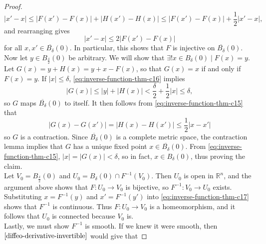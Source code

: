 \documentclass[reqno]{amsart}
\theoremstyle{plain}%
\theoremstyle{definition}
\theoremstyle{remark}
\begin{document}
\begin{proof}
        \[
        \left| x' - x \right| \le \left| F(x')- F(x) \right| +
        \left| H(x') - H(x) \right| \le 
        \left| F(x') - F(x) \right| +\frac{1}{2} \left| x' -x \right| ,
        \] 
        and rearranging gives
        \[
            \left| x' -x \right| \le 2 \left| F(x') - F(x) \right|
            \tag{$\gamma$}\label{eq:inverse-function-thm-c17}
        \] 
        for all $x,x' \in \overline{B_{\delta}}(0)$. In particular, this shows that
        $F$ is injective on $\overline{B_{\delta}}(0)$.\\
        Now let $y \in B_{\frac{\delta}{2}}(0)$ be arbitrary. We will show that
        $\exists ! x \in B_{\delta}(0)  \mid F(x)=y$. Let
        $G(x) = y + H(x) = y+x-F(x)$, so that $G(x) = x$ if and only if
        $F(x) = y$. If $\left| x \right| \le \delta$,
        \eqref{eq:inverse-function-thm-c16} implies
        \[
        \left| G(x) \right| \le \left| y \right| + \left| H(x) \right| 
        < \frac{\delta}{2} + \frac{1}{2}\left| x \right| \le \delta,
        \tag{$\beta$}\label{eq:inverse-function-thm-c18}
        \] 
        so $G$ maps $\overline{B_{\delta}}(0)$ to itself. It then follows from
        \eqref{eq:inverse-function-thm-c15} that
        \[
        \left| G(x) - G(x') \right| 
        = \left| H(x) - H(x') \right| \le \frac{1}{2} \left| x-x' \right|
        \] 
        so $G$ is a contraction.
        Since $\overline{B_{\delta}}(0)$ is a complete metric space, the
        contraction lemma implies that $G$ has a unique fixed point 
        $x \in \overline{B_{\delta}}(0)$. From \eqref{eq:inverse-function-thm-c15}, 
        $\left| x \right| = \left| G(x) \right| < \delta$, so in fact,
        $x \in B_{\delta}(0)$, thus proving the claim.\\
        \linebreak
        Let $V_0 = B_{\frac{\delta}{2}}(0)$ and $U_0
        = B_{\delta}(0) \cap F^{-1}(V_0)$. Then
        $U_0$ is open in $\mathbb{R}^{n}$, and the argument above shows that 
        $F  \colon U_0 \to V_0$ is bijective, so
        $F^{-1}  \colon V_0 \to U_0$ exists. Substituting
        $x = F^{-1}(y)$ and $x' = F^{-1}(y')$ into
        \eqref{eq:inverse-function-thm-c17} shows that $F^{-1}$ is continuous. Thus
        $F  \colon U_0 \to V_0$ is a homeomorphism, and it follows that $U_0$ is
        connected because $V_0$ is.\\
        \linebreak
        Lastly, we must show $F^{-1}$ is smooth. If we knew it were smooth,
        then $\ref{diffeo-derivative-invertible}$ would give that

\end{proof}
\end{document}
